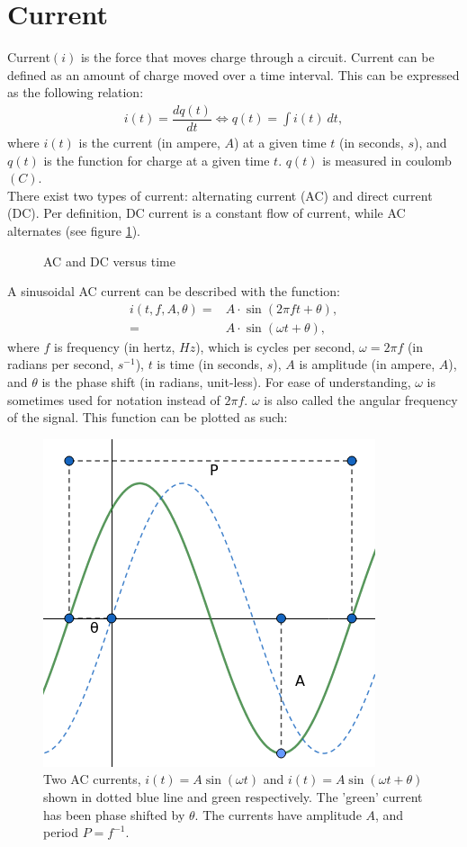 \section{Current}
Current$(i)$ is the force that moves charge through a circuit. Current can be defined as an amount of charge moved over a time interval. This can be expressed as the following relation: \cite[p.~3]{bcircuit5}
\begin{align}
i(t)=\dfrac{dq(t)}{dt} \Leftrightarrow q(t)=\int i(t)\ dt,\label{I=dq/dt}
\end{align}
where $i(t)$ is the current (in ampere, $A$) at a given time $t$ (in seconds, $s$), and $q(t)$ is the function for charge at a given time $t$. $q(t)$ is measured in coulomb $(C)$.
\\
There exist two types of current: alternating current (AC) and direct current (DC). Per definition, DC current is a constant flow of current, while AC alternates (see figure \ref{fig:ACDC}). 
\begin{figure}[H] 

\caption{AC and DC versus time}
\label{fig:ACDC}
\end{figure}
\noindent
A sinusoidal AC current can be described with the function: 
\begin{align}
i\left(t, f, A, \theta\right) =& A\cdot \sin{\left(2\pi ft + \theta\right)}, \nonumber
\\
=& A \cdot \sin{\left(\omega t + \theta\right)}, \label{eq:omega}
\end{align}
where $f$ is frequency (in hertz, $Hz$), which is cycles per second, $\omega = 2\pi f$ (in radians per second, $s^{-1}$), $t$ is time (in seconds, $s$), $A$ is amplitude (in ampere, $A$), and $\theta$ is the phase shift (in radians, unit-less).
For ease of understanding, $\omega$ is sometimes used for notation instead of $2\pi f$. $\omega$ is also called the angular frequency of the signal.
This function can be plotted as such:
\begin{figure}[H]
	\centering
	\includegraphics[scale=0.7]{fig/img/AC.png}
	\caption{Two AC currents, $i(t)=A\sin(\omega t)$ and $i(t)=A\sin(\omega t+\theta)$ shown in dotted blue line and green respectively. The 'green' current has been phase shifted by $\theta$. The currents have amplitude $A$, and period $P=f^{-1}$.}
\end{figure}
